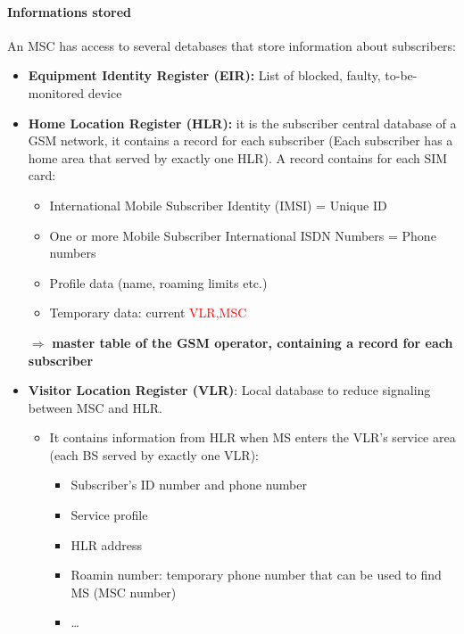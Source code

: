 \paragraph{Informations stored}
An MSC has access to several detabases that store information about subscribers:
\begin{itemize}

    \item \textbf{Equipment Identity Register (EIR):} List of blocked, faulty,
        to-be-monitored device

    \item \textbf{Home Location Register (HLR):} it is the subscriber
        central database of a GSM network, it contains a record for each
        subscriber (Each subscriber has a home area that served by
        exactly one HLR). A record contains for each SIM card:

        \begin{itemize}
            \item International Mobile Subscriber Identity (IMSI) = Unique ID
            \item One or more Mobile Subscriber International ISDN Numbers = Phone numbers
            \item Profile data (name, roaming limits etc.)
            \item Temporary data: current \textcolor{red}{VLR,MSC} 
        \end{itemize}

        $\Rightarrow$ \textbf{master table of the GSM operator,
        containing a record for each subscriber}

    \item \textbf{Visitor Location Register (VLR)}: Local database to
        reduce signaling between MSC and HLR. 

        \begin{itemize}
            \item It contains information from HLR when MS enters the
                VLR's service area (each BS served by exactly one VLR):
                \begin{itemize}
                    \item Subscriber's ID number and phone number
                    \item Service profile
                    \item HLR address
                    \item Roamin number: temporary phone number that can be used to find MS 
                        (MSC number)
                    \item \ldots
                \end{itemize}


\end{itemize}
\end{itemize}
